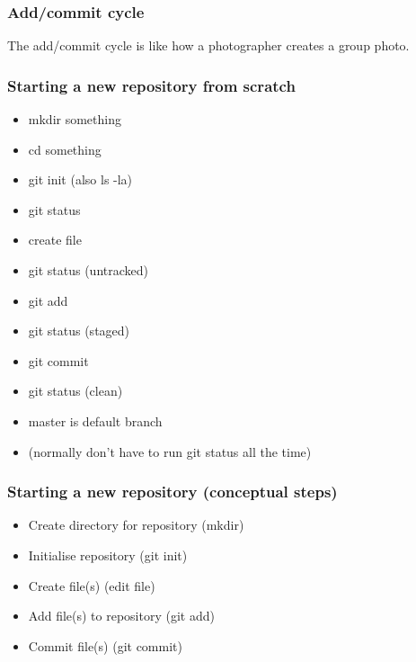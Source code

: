 \documentclass{git_course}
\begin{document}
\begin{frame}
\frametitle{Add/commit cycle}
The add/commit cycle is like how a photographer creates a group photo.
\end{frame}


\begin{frame}
\frametitle{Starting a new repository from scratch}
\begin{itemize}
    \item mkdir something
    \item cd something
    \item git init  (also ls -la)
    \item git status
    \item create file
    \item git status (untracked)
    \item git add
    \item git status (staged)
    \item git commit
    \item git status (clean)
    \item master is default branch
    \item (normally don't have to run git status all the time)
\end{itemize}
\end{frame}

\begin{frame}
    \frametitle{Starting a new repository (conceptual steps)}
    \begin{itemize}
        \item Create directory for repository (mkdir)
        \item Initialise repository (git init)
        \item Create file(s) (edit file)
        \item Add file(s) to repository (git add)
        \item Commit file(s) (git commit)
    \end{itemize}
\end{frame}
\end{document}
